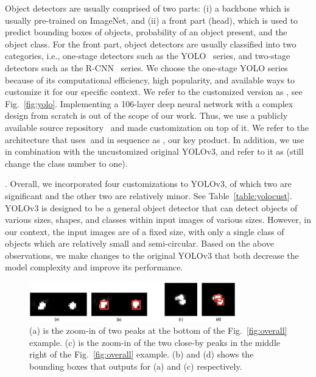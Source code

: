 Object detectors are usually comprised of two parts: (i) a backbone which is usually pre-trained on ImageNet, and (ii) a front part (head), which is used to predict bounding boxes of objects, probability of an object present, and the  object class. 
For the front part, object detectors are usually classified into two categories, i.e., one-stage detectors such as the YOLO~\cite{cvpr16-yolo} series, and two-stage detectors such as the R-CNN~\cite{cvpr14-rcnn} series.
We choose the one-stage YOLO series because of its computational efficiency, high popularity, and available ways to customize it for our specific context. We refer to the customized version as \yolocust, see Fig.~\ref{fig:yolo}.
Implementing a 106-layer deep neural network with a complex design from scratch is
out of the scope of our work. 
Thus, we use a publicly available source repository~\cite{yolo-github} and made customization on top of it.
We refer to the architecture that uses \imgimg $\ $and \yolocust in sequence as \our, our key product.  
In addition, we use \imgimg in combination with the uncustomized original YOLOv3,
and refer to it as \ouryolo (still change the class number to one).

.
Overall, we incorporated four customizations to YOLOv3, of which two are significant and the
other two are relatively minor. See Table~\ref{table:yolocust}. YOLOv3 is designed to be a general object detector that can detect objects of various sizes, shapes, and classes within input images
of various sizes. However, in our context, the input images are of a fixed size, with
only a single class of objects which are relatively small and semi-circular. 
Based on the above observations, we make changes to the original YOLOv3 that both 
decrease the model complexity and improve its performance.

\begin{figure}[t]
	\centering
	\includegraphics[width=0.8\textwidth]{chapters/wowmom-pmc/figures/peaks.png}
	\caption{(a) is the zoom-in of two peaks at the bottom of the Fig.~\ref{fig:overall} example.
	(c) is the zoom-in of the two close-by peaks in the middle right of the Fig.~\ref{fig:overall} example. (b) and (d) shows the bounding boxes that \yolocust outputs for (a) and (c) respectively.}
	\label{fig:peaks}
\end{figure}

